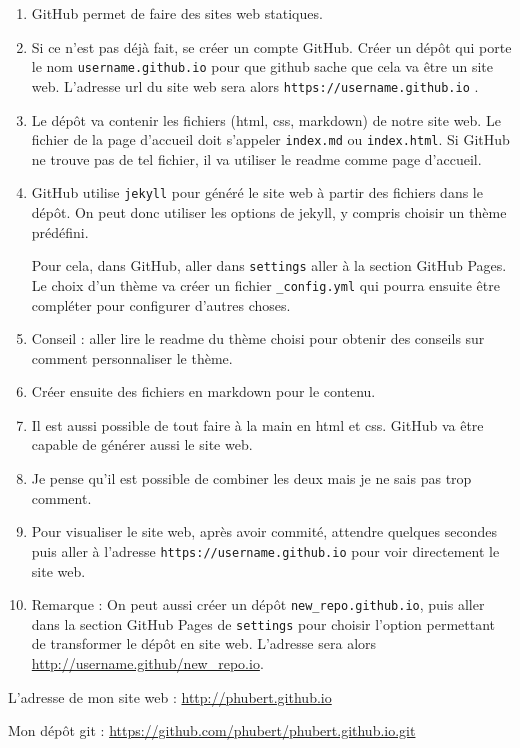 \documentclass[letter,12pt]{article}
\begin{document}
	\begin{enumerate}
		\item GitHub permet de faire des sites web statiques. 
		
		\item Si ce n'est pas déjà fait, se créer un compte GitHub. Créer un dépôt qui porte le nom \texttt{username.github.io} pour que github sache que cela va être un site web. L'adresse url du site web sera alors \texttt{https://username.github.io} .
		
		\item Le dépôt va contenir les fichiers (html, css, markdown) de notre site web. Le fichier de la page d'accueil doit s'appeler \texttt{index.md} ou \texttt{index.html}. Si GitHub ne trouve pas de tel fichier, il va utiliser le readme comme page d'accueil. 
		
		\item GitHub utilise \texttt{jekyll} pour généré le site web à partir des fichiers dans le dépôt. On peut donc utiliser les options de jekyll, y compris choisir un thème prédéfini. 
		
		Pour cela, dans GitHub, aller dans \texttt{settings} aller à la section GitHub Pages. Le choix d'un thème va créer un fichier \texttt{\_config.yml} qui pourra ensuite être compléter pour configurer d'autres choses. 
		
		\item Conseil : aller lire le readme du thème choisi pour obtenir des conseils sur comment personnaliser le thème. 
		
		\item Créer ensuite des fichiers en markdown pour le contenu.
		
		\item Il est aussi possible de tout faire à la main en html et css. GitHub va être capable de générer aussi le site web. 
		
		\item Je pense qu'il est possible de combiner les deux mais je ne sais pas trop comment. 
		
		\item Pour visualiser le site web, après avoir commité, attendre quelques secondes puis aller à l'adresse \texttt{https://username.github.io} pour voir directement le site web. 
		
		\item Remarque : On peut aussi créer un dépôt  \texttt{new\_repo.github.io}, puis aller dans la section GitHub Pages de \texttt{settings} pour choisir l'option permettant de transformer le dépôt en site web. L'adresse sera alors \url{http://username.github/new\_repo.io}. 
	\end{enumerate}

	L'adresse de mon site web : \url{http://phubert.github.io}
	
	Mon dépôt git : \url{https://github.com/phubert/phubert.github.io.git}
\end{document}
